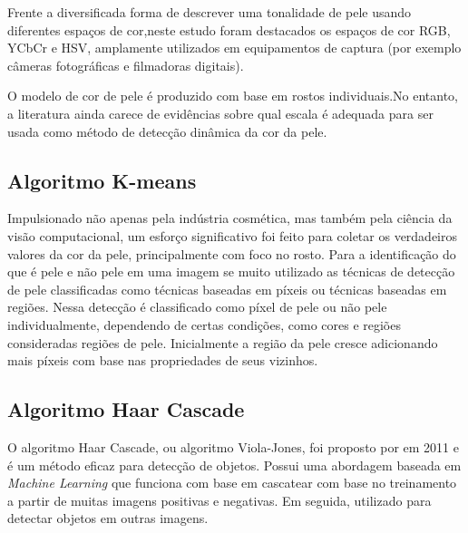 Frente a diversificada forma de descrever uma tonalidade de pele usando diferentes espaços de cor,neste estudo foram destacados os espaços de cor RGB, YCbCr e HSV, amplamente utilizados em equipamentos de captura (por exemplo câmeras fotográficas e filmadoras digitais). 

O modelo de cor de pele é produzido com base em rostos
individuais.No entanto, a literatura ainda carece de evidências sobre
qual escala é adequada para ser usada como método de detecção
dinâmica da cor da pele.

\subsection{Algoritmo K-means}
Impulsionado não apenas pela indústria cosmética, mas também pela ciência da visão computacional, um esforço significativo foi feito para coletar os verdadeiros valores da cor da pele, principalmente com foco no rosto. Para a identificação do que é pele e não pele em uma imagem se muito utilizado as técnicas de detecção de pele classificadas como técnicas baseadas em píxeis ou técnicas baseadas em regiões. Nessa detecção é classificado como píxel de pele ou não pele individualmente, dependendo de certas condições, como cores e regiões consideradas regiões de pele. Inicialmente a região da pele cresce adicionando mais píxeis com base nas propriedades de seus vizinhos.

\subsection{Algoritmo Haar Cascade}
O algoritmo Haar Cascade, ou algoritmo Viola-Jones, foi proposto por \cite{Viola-Jones} em 2011 e é um método eficaz para detecção de objetos. Possui uma abordagem baseada em \textit{Machine Learning} que funciona com base em cascatear com base no treinamento a partir de muitas imagens positivas e negativas. Em seguida, utilizado para detectar objetos em outras imagens.

